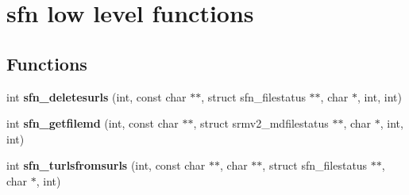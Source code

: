\section{sfn low level functions}
\label{group__sfn__low__group}
\subsection*{Functions}
\begin{CompactItemize}
\item 
int \textbf{sfn\_\-deletesurls} (int, const char $\ast$$\ast$, struct sfn\_\-filestatus $\ast$$\ast$, char $\ast$, int, int)\label{group__sfn__low__group_g8f66412c50cf1257cf2f35a7e49aa78c}

\item 
int \textbf{sfn\_\-getfilemd} (int, const char $\ast$$\ast$, struct srmv2\_\-mdfilestatus $\ast$$\ast$, char $\ast$, int, int)\label{group__sfn__low__group_g6f09e0b4efd0277a3cada62545f92983}

\item 
int \textbf{sfn\_\-turlsfromsurls} (int, const char $\ast$$\ast$, char $\ast$$\ast$, struct sfn\_\-filestatus $\ast$$\ast$, char $\ast$, int)\label{group__sfn__low__group_g012d966e990538d444d2275c8159c1e3}

\end{CompactItemize}

